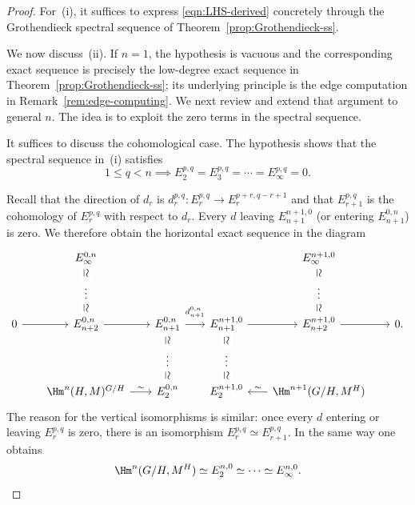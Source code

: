 
\begin{proof}
	For~(i), it suffices to express \eqref{eqn:LHS-derived} concretely through
	the Grothendieck spectral sequence of
	Theorem~\ref{prop:Grothendieck-ss}.

	We now discuss~(ii). If $n=1$, the hypothesis is vacuous and the
	corresponding exact sequence is precisely the low-degree exact sequence in
	Theorem~\ref{prop:Grothendieck-ss}; its underlying principle is the edge
	computation in Remark~\ref{rem:edge-computing}. We next review and extend
	that argument to general $n$. The idea is to exploit the zero terms in the
	spectral sequence.

	It suffices to discuss the cohomological case. The hypothesis shows that
	the spectral sequence in~(i) satisfies
	\[ 1\leq q<n\implies
	E_2^{p,q}=E_3^{p,q}=\cdots=E_\infty^{p,q}=0. \]

	Recall that the direction of $d_r$ is
	$d_r^{p,q}:E_r^{p,q}\to E_r^{p+r,q-r+1}$ and that $E_{r+1}^{p,q}$ is the
	cohomology of $E_r^{p,q}$ with respect to $d_r$. Every $d$ leaving
	$E_{n+1}^{n+1,0}$ (or entering $E_{n+1}^{0,n}$) is zero. We therefore
	obtain the horizontal exact sequence in the diagram
	\[\begin{tikzcd}[row sep=small, column sep=scriptsize]
		& E_\infty^{0,n} \arrow[phantom,d,"\simeq" description,sloped]
		& & & E_\infty^{n+1,0}
		\arrow[phantom,d,"\simeq" description,sloped] & \\
		& \vdots \arrow[phantom,d,"\simeq" description,sloped]
		& & & \vdots \arrow[phantom,d,"\simeq" description,sloped] & \\
		0 \arrow[r] & E_{n+2}^{0,n} \arrow[r] &
		E_{n+1}^{0,n} \arrow[r,"{d^{0,n}_{n+1}}" inner sep=0.6em]
		\arrow[phantom,d,"\simeq" description,sloped] &
		E_{n+1}^{n+1,0} \arrow[r]
		\arrow[phantom,d,"\simeq" description,sloped] &
		E_{n+2}^{n+1,0} \arrow[r] & 0. \\
		& & \vdots \arrow[phantom,d,"\simeq" description,sloped] &
		\vdots \arrow[phantom,d,"\simeq" description,sloped] & & \\
		& \Hm^n(H,M)^{G/H} \arrow[r,"\sim"] & E_2^{0,n} & E_2^{n+1,0} &
		\Hm^{n+1}(G/H,M^H) \arrow[l,"\sim"'] &
	\end{tikzcd}\]
	The reason for the vertical isomorphisms is similar: once every $d$
	entering or leaving $E_r^{p,q}$ is zero, there is an isomorphism
	$E_r^{p,q}\simeq E_{r+1}^{p,q}$. In the same way one obtains
	\[ \Hm^n(G/H,M^H)\simeq E_2^{n,0}\simeq\cdots
	\simeq E_\infty^{n,0}. \]


\end{proof}

